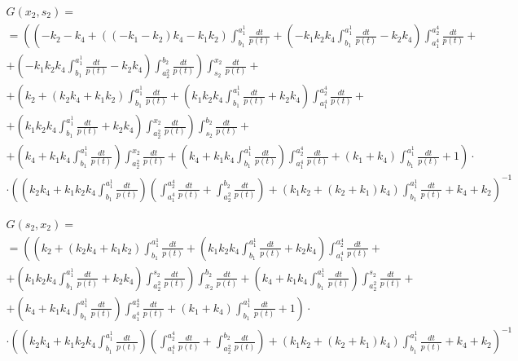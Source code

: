 \documentclass[a4paper,12pt]{article} %
\begin{document}
\begin{multline}
	G(x_2,s_2)=\\=
	\left(
		\left(
			-k_2-k_4+\left( \left( -k_1-k_2\right)  k_4-k_1 k_2\right)  \int_{b_1}^{a_1^1}\frac{dt}{p(t)}+\left( -k_1 k_2 k_4 \int_{b_1}^{a_1^1}\frac{dt}{p(t)}-k_2 k_4\right)  \int_{a_1^4}^{a_2^4}\frac{dt}{p(t)}
			\right. \right. + \\ + \left. \left.
			\left( -k_1 k_2 k_4 \int_{b_1}^{a_1^1}\frac{dt}{p(t)}-k_2 k_4\right)  \int_{a_2^2}^{b_2}\frac{dt}{p(t)}
		\right)
		\int_{s_2}^{x_2}\frac{dt}{p(t)}
		\right. + \\ + \left.
		\left( k_2+\left( k_2 k_4+k_1 k_2\right)  \int_{b_1}^{a_1^1}\frac{dt}{p(t)}+\left( k_1 k_2 k_4 \int_{b_1}^{a_1^1}\frac{dt}{p(t)}
		+%
		k_2 k_4\right)  \int_{a_1^4}^{a_2^4}\frac{dt}{p(t)}
		\right. \right. + \\ + \left. \left.
		\left( k_1 k_2 k_4 \int_{b_1}^{a_1^1}\frac{dt}{p(t)}+k_2 k_4\right)  \int_{a_2^2}^{x_2}\frac{dt}{p(t)}\right)  \int_{s_2}^{b_2}\frac{dt}{p(t)}
		\right. + \\ + \left.
		\left( k_4+k_1 k_4 \int_{b_1}^{a_1^1}\frac{dt}{p(t)}\right)  \int_{a_2^2}^{x_2}\frac{dt}{p(t)}+\left( k_4+k_1 k_4 \int_{b_1}^{a_1^1}\frac{dt}{p(t)}\right)  \int_{a_1^4}^{a_2^4}\frac{dt}{p(t)}+\left( k_1+k_4\right)  \int_{b_1}^{a_1^1}\frac{dt}{p(t)}+1
	\right) \cdot \\ \cdot \left(
		\left( k_2 k_4+k_1 k_2 k_4 \int_{b_1}^{a_1^1}\frac{dt}{p(t)}\right)
		\left( \int_{a_1^4}^{a_2^4}\frac{dt}{p(t)}+ \int_{a_2^2}^{b_2}\frac{dt}{p(t)} \right)+
		\left( k_1 k_2+\left( k_2+k_1\right)  k_4\right)  \int_{b_1}^{a_1^1}\frac{dt}{p(t)}+k_4+k_2
	\right)^{-1}
\end{multline}


\begin{multline}
	G(s_2,x_2)=\\=
	\left(
		\left( k_2+\left( k_2 k_4+k_1 k_2\right)  \int_{b_1}^{a_1^1}\frac{dt}{p(t)}+
		\left( k_1 k_2 k_4 \int_{b_1}^{a_1^1}\frac{dt}{p(t)}+k_2 k_4\right)  \int_{a_1^4}^{a_2^4}\frac{dt}{p(t)}
		\right. \right. + \\ + \left. \left.
		\left( k_1 k_2 k_4 \int_{b_1}^{a_1^1}\frac{dt}{p(t)}
		+%
		k_2 k_4\right)  \int_{a_2^2}^{s_2}\frac{dt}{p(t)}\right)  \int_{x_2}^{b_2}\frac{dt}{p(t)}+
		\left( k_4+k_1 k_4 \int_{b_1}^{a_1^1}\frac{dt}{p(t)}\right)  \int_{a_2^2}^{s_2}\frac{dt}{p(t)}
		\right. + \\ + \left.
		\left( k_4+k_1 k_4 \int_{b_1}^{a_1^1}\frac{dt}{p(t)}\right)  \int_{a_1^4}^{a_2^4}\frac{dt}{p(t)}+\left( k_1+k_4\right)  \int_{b_1}^{a_1^1}\frac{dt}{p(t)}+1
	\right) \cdot \\ \cdot \left(
		\left( k_2 k_4+k_1 k_2 k_4 \int_{b_1}^{a_1^1}\frac{dt}{p(t)}\right)
		\left( \int_{a_1^4}^{a_2^4}\frac{dt}{p(t)}+ \int_{a_2^2}^{b_2}\frac{dt}{p(t)} \right)+
		\left( k_1 k_2+\left( k_2+k_1\right)  k_4\right)  \int_{b_1}^{a_1^1}\frac{dt}{p(t)}+k_4+k_2
	\right)^{-1}
\end{multline}
\end{document}
